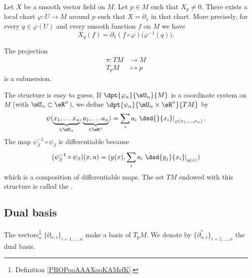 \begin{lemma}       \label{LEMooLNIAooCmbLQp}
	Let \( X\) be a smooth vector field on \( M\). Let \( p\in M\) such that \( X_p\neq 0\). There exists a local chart \( \varphi\colon U\to M\) around \( p\) such that \( X=\partial_1\) in that chart. More precisely, for every \( q\in \varphi(U)\) and every smooth function \( f\) on \( M\) we have
	\begin{equation}
		X_q(f)=\partial_1(f\circ \varphi)\big( \varphi^{-1}(q) \big).
	\end{equation}
\end{lemma}


\begin{proposition}			\label{PROPooMDDPooXeQwrH}
	The projection
	\begin{equation}
		\begin{aligned}
			\pi \colon TM & \to M     \\
			T_pM          & \mapsto p
		\end{aligned}
	\end{equation}
	is a submersion.
\end{proposition}

The structure is easy to guess. If $\dpt{\varphi_{\alpha}}{\mU_{\alpha}}{M}$ is a coordinate system on $M$ (with $\mU_{\alpha}\subset\eR^n$), we define $\dpt{\psi_{\alpha}}{\mU_{\alpha}\times \eR^n}{TM}$ by
\[
	\psi( \underbrace{x_1,\ldots x_n}_{\in\mU_{\alpha}},\underbrace{a_1,\ldots a_n}_{\in\eR^n}  )
	=\sum_i a_i\left.\dsd{}{x_i}\right|_{\varphi(x_1,\ldots,x_n)}.
\]
The map $\psi_{\beta}^{-1}\circ\psi_{\beta}$ is differentiable because
\[
	(\psi_{\beta}^{-1}\circ\psi_{\beta})(x,a)=( y(x),\sum_i a_i\left.\dsd{y_j}{x_i}\right|_{y(x)}  )
\]
which is a composition of differentiable maps. The set $TM$ endowed with this structure is called the .


\subsection{Dual basis}


\begin{definition}		\label{DEFooZNHIooKIpND}
	The vectors\footnote{Definition \ref{PROPooAAAXooKAMsfK}.} \( \{ \partial_{\alpha,i} \}_{i=1,\ldots,n}\) make a basis of \( T_pM\). We denote by \( \{ \partial^*_{\alpha, i} \}_{i=1,\ldots,n}\) the dual basis.
\end{definition}


